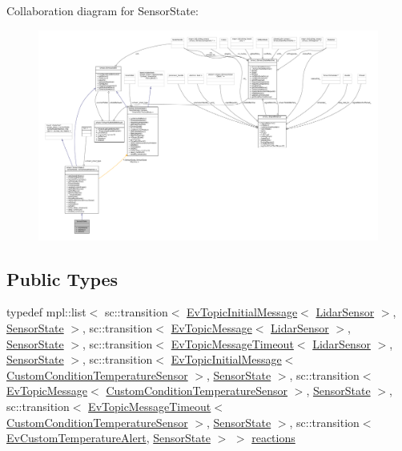 Collaboration diagram for Sensor\+State\+:
\nopagebreak
\begin{figure}[H]
\begin{center}
\leavevmode
\includegraphics[width=350pt]{structSensorState__coll__graph}
\end{center}
\end{figure}
\subsection*{Public Types}
\begin{DoxyCompactItemize}
\item 
typedef mpl\+::list$<$ sc\+::transition$<$ \hyperlink{structsmacc_1_1EvTopicInitialMessage}{Ev\+Topic\+Initial\+Message}$<$ \hyperlink{sensor__state_8h_a9db9e1944f88de79507758d08e4a2ee3}{Lidar\+Sensor} $>$, \hyperlink{structSensorState}{Sensor\+State} $>$, sc\+::transition$<$ \hyperlink{structsmacc_1_1EvTopicMessage}{Ev\+Topic\+Message}$<$ \hyperlink{sensor__state_8h_a9db9e1944f88de79507758d08e4a2ee3}{Lidar\+Sensor} $>$, \hyperlink{structSensorState}{Sensor\+State} $>$, sc\+::transition$<$ \hyperlink{structsmacc_1_1EvTopicMessageTimeout}{Ev\+Topic\+Message\+Timeout}$<$ \hyperlink{sensor__state_8h_a9db9e1944f88de79507758d08e4a2ee3}{Lidar\+Sensor} $>$, \hyperlink{structSensorState}{Sensor\+State} $>$, sc\+::transition$<$ \hyperlink{structsmacc_1_1EvTopicInitialMessage}{Ev\+Topic\+Initial\+Message}$<$ \hyperlink{classCustomConditionTemperatureSensor}{Custom\+Condition\+Temperature\+Sensor} $>$, \hyperlink{structSensorState}{Sensor\+State} $>$, sc\+::transition$<$ \hyperlink{structsmacc_1_1EvTopicMessage}{Ev\+Topic\+Message}$<$ \hyperlink{classCustomConditionTemperatureSensor}{Custom\+Condition\+Temperature\+Sensor} $>$, \hyperlink{structSensorState}{Sensor\+State} $>$, sc\+::transition$<$ \hyperlink{structsmacc_1_1EvTopicMessageTimeout}{Ev\+Topic\+Message\+Timeout}$<$ \hyperlink{classCustomConditionTemperatureSensor}{Custom\+Condition\+Temperature\+Sensor} $>$, \hyperlink{structSensorState}{Sensor\+State} $>$, sc\+::transition$<$ \hyperlink{structEvCustomTemperatureAlert}{Ev\+Custom\+Temperature\+Alert}, \hyperlink{structSensorState}{Sensor\+State} $>$ $>$ \hyperlink{structSensorState_aad643eee73f46db780c8f30fde51d23f}{reactions}
\end{DoxyCompactItemize}

